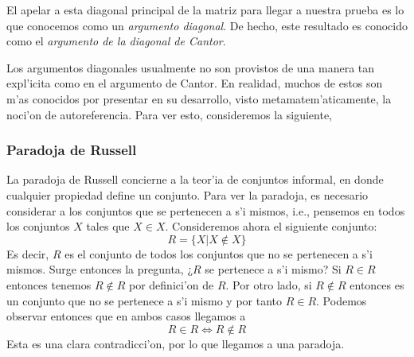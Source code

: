 \begin{center}

\end{center}

El apelar a esta diagonal principal de la matriz para llegar a nuestra prueba es lo que conocemos como un \emph{argumento diagonal}. De hecho, este resultado es conocido como el \textit{argumento de la diagonal de Cantor}.

Los argumentos diagonales usualmente no son provistos de una manera tan expl'icita como en el argumento de Cantor. En realidad, muchos de estos son m'as conocidos por presentar en su desarrollo, visto metamatem'aticamente, la noci'on de autoreferencia. Para ver esto, consideremos la siguiente,

\subsubsection*{Paradoja de Russell}

La paradoja de Russell concierne a la teor'ia de conjuntos informal, en donde cualquier propiedad define un conjunto. Para ver la paradoja, es necesario considerar a los conjuntos que se pertenecen a s'i mismos, i.e., pensemos en todos los conjuntos $X$ tales que $X\in X$. Consideremos ahora el siguiente conjunto: 
\[R = \{X\vert X\notin X\}\]
Es decir, $R$ es el conjunto de todos los conjuntos que no se pertenecen a s'i mismos. Surge entonces la pregunta, ¿$R$ se pertenece a s'i mismo? Si $R\in R$ entonces tenemos $R\notin R$ por definici'on de $R$. Por otro lado, si $R\notin R$ entonces es un conjunto que no se pertenece a s'i mismo y por tanto $R\in R$. Podemos observar entonces que en ambos casos llegamos a 
\[R\in R \iff R\notin R\]
Esta es una clara contradicci'on, por lo que llegamos a una paradoja. 

